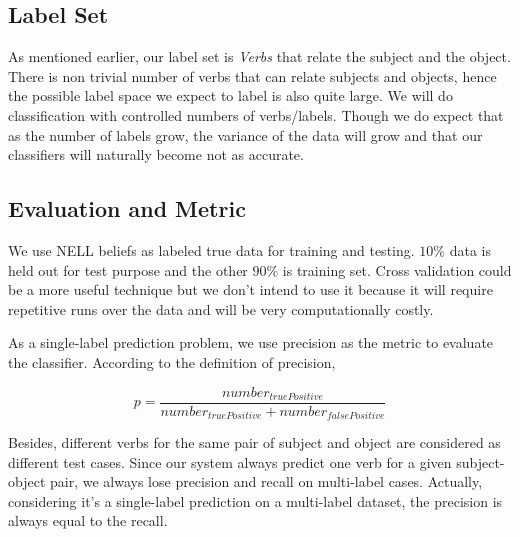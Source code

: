 \subsection{Label Set}

As mentioned earlier, our label set is \emph{Verbs} that relate the subject and the object. There is non trivial number of verbs that can relate subjects and objects, hence the possible label space we expect to label is also quite large. We will do classification with controlled numbers of verbs/labels. Though we do expect that as the number of labels grow, the variance of the data will grow and that our classifiers will naturally become not as accurate.

\subsection{Evaluation and Metric}

We use NELL beliefs as labeled true data for training and testing. $10\%$ data is held out for test purpose and the other $90\%$ is training set. Cross validation could be a more useful technique but we don't intend to use it because it will require repetitive runs over the data and will be very computationally costly.

As a single-label prediction problem, we use precision as the metric to evaluate the classifier. According to the definition of precision,

\begin{equation}
	p = \frac{number_{truePositive}}{number_{truePositive} + number_{falsePositive}}
\end{equation}

Besides, different verbs for the same pair of subject and object are considered as different test cases. Since our system always predict one verb for a given subject-object pair, we always lose precision and recall on multi-label cases. Actually, considering it's a single-label prediction on a multi-label dataset, the precision is always equal to the recall.




